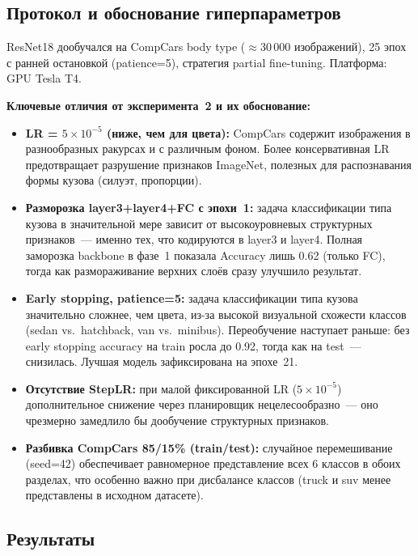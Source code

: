 \documentclass[14pt,a4paper]{report}
\numberwithin{equation}{chapter}
\numberwithin{figure}{chapter}
\numberwithin{table}{chapter}
\begin{document}
\subsection{Протокол и обоснование гиперпараметров}

ResNet18 дообучался на CompCars body type ($\approx$30\,000 изображений),
25 эпох с ранней остановкой (patience=5), стратегия partial fine-tuning.
Платформа: GPU Tesla T4.

\textbf{Ключевые отличия от эксперимента~2 и их обоснование:}
\begin{itemize}
  \item \textbf{LR = $5\times10^{-5}$ (ниже, чем для цвета):}
    CompCars содержит изображения в разнообразных ракурсах и с
    различным фоном. Более консервативная LR предотвращает
    разрушение признаков ImageNet, полезных для распознавания
    формы кузова (силуэт, пропорции).

  \item \textbf{Разморозка layer3+layer4+FC с эпохи~1:}
    задача классификации типа кузова в значительной мере зависит
    от высокоуровневых структурных признаков~--- именно тех, что
    кодируются в layer3 и layer4. Полная заморозка backbone
    в фазе~1 показала Accuracy лишь 0.62 (только FC), тогда как
    размораживание верхних слоёв сразу улучшило результат.

  \item \textbf{Early stopping, patience=5:}
    задача классификации типа кузова значительно сложнее, чем
    цвета, из-за высокой визуальной схожести классов
    (sedan vs.\ hatchback, van vs.\ minibus). Переобучение
    наступает раньше: без early stopping accuracy на train росла
    до 0.92, тогда как на test~--- снизилась. Лучшая модель
    зафиксирована на эпохе~21.

  \item \textbf{Отсутствие StepLR:} при малой фиксированной LR
    ($5\times10^{-5}$) дополнительное снижение через планировщик
    нецелесообразно~--- оно чрезмерно замедлило бы дообучение
    структурных признаков.

  \item \textbf{Разбивка CompCars 85/15\% (train/test):} случайное перемешивание (seed=42) обеспечивает равномерное представление всех 6 классов
    в обоих разделах, что особенно важно при дисбалансе классов
    (truck и suv менее представлены в исходном датасете).
\end{itemize}

\subsection{Результаты}
\end{document}

